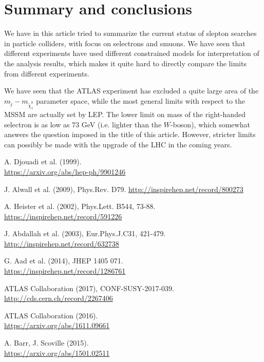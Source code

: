 \documentclass[twocolumn,a4paper,10pt]{article}
\begin{document}
\section{Summary and conclusions}

We have in this article tried to summarize the current status of slepton searches in particle 
colliders, with focus on selectrons and smuons. We have seen that different experiments have used 
different constrained models for interpretation of the analysis results, which makes it quite hard to 
directly compare the limits from different experiments. 

We have seen that the ATLAS experiment has excluded a quite large area of the 
$m_{\tilde{\ell}}-m_{\tilde{\chi}_1^0}$ parameter space, while the most general limits with respect 
to the MSSM are actually set by LEP. The lower limit on mass of the right-handed selectron is as 
low as $73$ GeV (i.e. lighter than the $W$-boson), which somewhat answers the question imposed in 
the title of this article. However, stricter limits can possibly be made with the upgrade of the LHC 
in the coming years. 

\begin{thebibliography}{9}


  A. Djouadi et al. (1999). \\
  \href{https://arxiv.org/abs/hep-ph/9901246}{https://arxiv.org/abs/hep-ph/9901246}

  J. Alwall et al. (2009), Phys.Rev. D79. 
  \href{http://inspirehep.net/record/800273}{http://inspirehep.net/record/800273}

  A. Heister et al. (2002), Phys.Lett. B544, 73-88. 
  \href{https://inspirehep.net/record/591226}{https://inspirehep.net/record/591226}
 
  J. Abdallah et al. (2003), Eur.Phys.J.C31, 421-479. 
  \href{http://inspirehep.net/record/632738}{http://inspirehep.net/record/632738}	

  G. Aad et al. (2014), JHEP 1405 071. \\
  \href{https://inspirehep.net/record/1286761}{https://inspirehep.net/record/1286761}

  ATLAS Collaboration (2017), CONF-SUSY-2017-039. 
  \href{http://cds.cern.ch/record/2267406}{http://cds.cern.ch/record/2267406}      

  ATLAS Collaboration (2016). \\
  \href{https://arxiv.org/abs/1611.09661}{https://arxiv.org/abs/1611.09661}   

  A. Barr, J. Scoville (2015). \\ 
  \href{https://arxiv.org/abs/1501.02511}{https://arxiv.org/abs/1501.02511}
 
\end{thebibliography}
\end{document}

